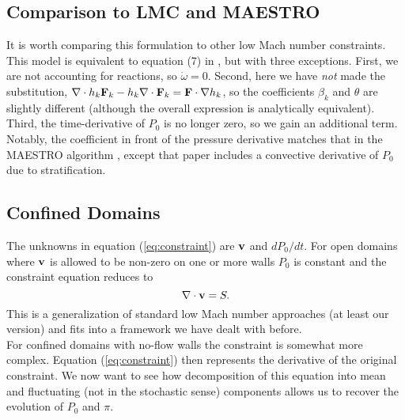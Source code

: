 \documentclass[final]{siamltex}
\def\Fb {{\bf F}}
\def\vb {{\bf v}}
\begin{document}
\subsection{Comparison to LMC and MAESTRO}
It is worth comparing this formulation to other low Mach number constraints.
This model is equivalent to equation (7) in \cite{DayBell:2000},
but with three exceptions.  First,
we are not accounting for reactions, so $\dot\omega=0$.  Second, here we have 
{\it not} made the substitution, 
$\nabla\cdot h_k\Fb_k - h_k\nabla\cdot\Fb_k = \Fb\cdot\nabla h_k$, so the coefficients
$\beta_k$ and $\theta$ are slightly different (although the overall expression is
analytically equivalent).  Third, the time-derivative of $P_0$ is no longer zero,
so we gain an additional term.  Notably, the coefficient in front of the pressure 
derivative matches that in the MAESTRO algorithm \cite{MAESTROIII},
except that paper includes a convective derivative of $P_0$ due to stratification.

\subsection{Confined Domains}
The unknowns in equation (\ref{eq:constraint}) are $\vb$ and $d P_0/d t$.
For open domains where $\vb$ is allowed to be non-zero on one or more walls $P_0$
is constant and the constraint equation reduces to
\begin{equation}
\nabla\cdot\vb = S.
\end{equation}
This is a generalization of standard low Mach number approaches (at least our version) 
and fits into
a framework we have dealt with before.\\

For confined domains with no-flow walls the constraint is somewhat more complex.
Equation (\ref{eq:constraint}) then represents the derivative of the original
constraint.  We now want to see how
decomposition of this equation into mean and fluctuating (not in the stochastic sense)
components allows us to recover the evolution of $P_0$ and $\pi$.\\
\end{document}
